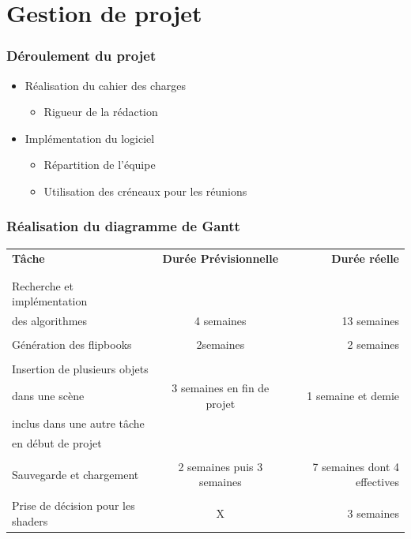 \documentclass{beamer}
\begin{document}
\section{Gestion de projet}

\begin{frame}
\frametitle{Déroulement du projet}
\begin{itemize}[label=$\bullet$]
\item Réalisation du cahier des charges
	\begin{itemize}[label=$\circ$]
	\item Rigueur de la rédaction
	\end{itemize}
\item Implémentation du logiciel
	\begin{itemize}[label=$\circ$]
	\item Répartition de l'équipe
	\item Utilisation des créneaux pour les réunions
	\end{itemize}
\end{itemize}

\end{frame}


\begin{frame}
\frametitle{Réalisation du diagramme de Gantt}
{\fontsize{7}{8}\selectfont
{}
\begin{tabular}{lcr}

\textbf{Tâche} & \textbf{Durée Prévisionnelle} & \textbf{Durée réelle} \\
\\
\hline
\\
Recherche et implémentation \\des algorithmes &
4 semaines & 13 semaines \\
\hline
\\
Génération des flipbooks & 2semaines & 2 semaines \\
\hline
\\
Insertion de plusieurs objets \\ dans une scène &
3 semaines en fin de projet & 
1 semaine et demie \\ inclus dans 
une autre tâche \\ en début de projet \\
\hline
\\
Sauvegarde et chargement & 2 semaines puis 3 semaines &
7 semaines dont 4 effectives \\
\hline
\\
Prise de décision pour les shaders & X & 3 semaines\\

\end{tabular}
}

\end{frame}
\end{document}

